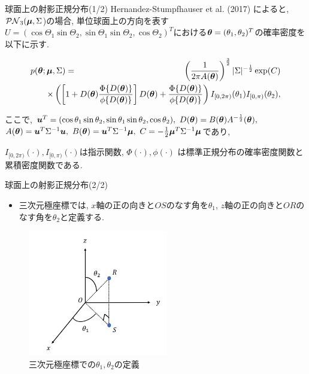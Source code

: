 \documentclass[dvipdfmx]{beamer} %
\newcommand{\bm}[1]{\mbox{\boldmath $#1$}}
\begin{document}
\begin{frame}{球面上の射影正規分布(1/2)}
Hernandez-Stumpfhauser et al. (2017) によると, $\mathcal{PN}_3(\bm \mu,\Sigma$)の場合, 単位球面上の方向を表す$U = (\cos\Theta_1 \sin \Theta_2, \sin\Theta_1 \sin \Theta_2, \cos \Theta_2)^T$における$\bm \theta = (\theta_1, \theta_2)^T$の確率密度を以下に示す.

\vspace{-0.2cm}
\small %
\begin{eqnarray*}
\label{PNS}
p(\bm \theta; \bm \mu, \Sigma) &=& \left(\frac{1}{2\pi A(\bm \theta)}\right)^{\frac{3}{2}} |\Sigma|^{-\frac{1}{2}}
\exp(C) \nonumber \\ 
&& \hspace{-1.5cm} \times \left( \left[1 + D(\bm \theta) \frac{\Phi \{D(\bm \theta)\}}{\phi \{D(\bm \theta)\}} \right] D(\bm \theta) + \frac{\Phi \{D(\bm \theta)\}}{\phi \{D(\bm \theta)\}} \right) I_{[0,2\pi)}(\theta_1) I_{[0,\pi)}(\theta_2),
\end{eqnarray*}
\normalsize

ここで, $\bm u^T = (\cos\theta_1 \sin \theta_2, \sin\theta_1 \sin \theta_2, \cos \theta_2), \ D(\bm \theta) = B(\bm \theta) A^{-\frac{1}{2}}(\bm \theta),$
$A(\bm \theta) = \bm u^T \Sigma^{-1} \bm u,\ B(\bm \theta) = \bm u^T \Sigma^{-1} \bm \mu, \ C = -\frac{1}{2} \bm \mu^T \Sigma^{-1} \bm \mu$であり, 

$I_{[0,2\pi)} (\cdot), I_{[0,\pi)}(\cdot)$は指示関数, $\Phi(\cdot), \phi(\cdot)$ は標準正規分布の確率密度関数と累積密度関数である. 
\end{frame}

\begin{frame}{球面上の射影正規分布(2/2)}

\begin{itemize}
\item 
三次元極座標では, $x$軸の正の向きと$OS$のなす角を$\theta_1$, $z$軸の正の向きと$OR$のなす角を$\theta_2$と定義する.
\end{itemize}

\vspace{-0.2cm}
\begin{figure}[tbp]
\begin{center}
\includegraphics[clip,height= 55mm]{data/theta_sample.png}
\end{center}
\caption{三次元極座標での$\theta_1, \theta_2$の定義}
\label{thetasample}
\end{figure}
\end{frame}
\end{document}
